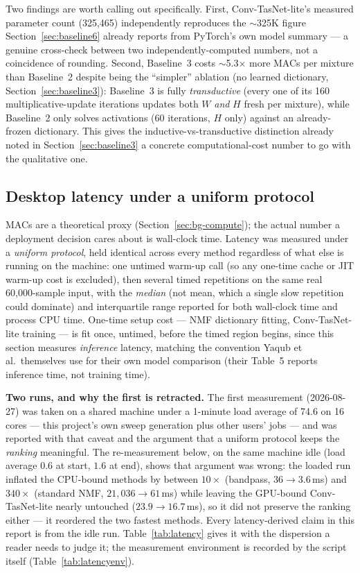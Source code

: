\documentclass[11pt]{article}
\begin{document}
Two findings are worth calling out specifically. First, Conv-TasNet-lite's
measured parameter count (325{,}465) independently reproduces the
$\sim$325K figure Section~\ref{sec:baseline6} already reports from
PyTorch's own model summary --- a genuine cross-check between two
independently-computed numbers, not a coincidence of rounding. Second,
Baseline~3 costs $\sim$5.3$\times$ more MACs per mixture than Baseline~2
despite being the ``simpler'' ablation (no learned dictionary,
Section~\ref{sec:baseline3}): Baseline~3 is fully \emph{transductive}
(every one of its 160 multiplicative-update iterations updates both $W$
\emph{and} $H$ fresh per mixture), while Baseline~2 only solves
activations (60 iterations, $H$ only) against an already-frozen
dictionary. This gives the inductive-vs-transductive distinction already
noted in Section~\ref{sec:baseline3} a concrete computational-cost number
to go with the qualitative one.

\subsection{Desktop latency under a uniform protocol}
\label{sec:latency}

MACs are a theoretical proxy (Section~\ref{sec:bg-compute}); the actual
number a deployment decision cares about is wall-clock time. Latency was
measured under a \emph{uniform protocol}, held identical across every
method regardless of what else is running on the machine: one untimed
warm-up call (so any one-time cache or JIT warm-up cost is excluded), then
several timed repetitions on the same real 60{,}000-sample input, with the
\emph{median} (not mean, which a single slow repetition could dominate)
and interquartile range reported for both wall-clock time and process CPU
time. One-time setup cost --- NMF dictionary fitting, Conv-TasNet-lite
training --- is fit once, untimed, before the timed region begins, since
this section measures \emph{inference} latency, matching the convention
Yaqub et al.\ themselves use for their own model comparison (their
Table~5 reports inference time, not training time).

\textbf{Two runs, and why the first is retracted.} The first measurement
(2026-08-27) was taken on a shared machine under a 1-minute load average
of 74.6 on 16 cores --- this project's own sweep generation plus other
users' jobs --- and was reported with that caveat and the argument that a
uniform protocol keeps the \emph{ranking} meaningful. The re-measurement
below, on the same machine idle (load average $0.6$ at start, $1.6$ at
end), shows that argument was wrong: the loaded run inflated the
CPU-bound methods by between $10\times$ (bandpass, $36 \to 3.6$\,ms) and
$340\times$ (standard NMF, $21{,}036 \to 61$\,ms) while leaving the
GPU-bound Conv-TasNet-lite nearly untouched ($23.9 \to 16.7$\,ms), so it
did not preserve the ranking either --- it reordered the two fastest
methods. Every latency-derived claim in this report is from the idle run.
Table~\ref{tab:latency} gives it with the dispersion a reader needs to
judge it; the measurement environment is recorded by the script itself
(Table~\ref{tab:latencyenv}).
\end{document}
